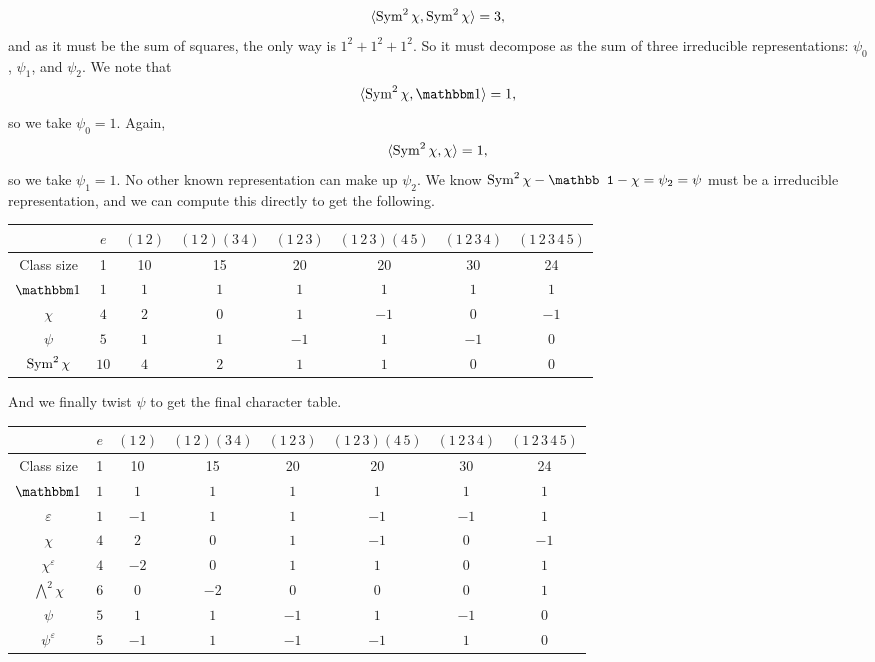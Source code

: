 \begin{example}
    \[\langle \operatorname{Sym}^2\chi, \operatorname{Sym}^2\chi \rangle = 3,\] and as it must be the sum of squares, the only way is $1^2 + 1^2 + 1^2$. So it must decompose as the sum of three irreducible representations: $\psi_0$, $\psi_1$, and $\psi_2$. We note that
    \[ \langle \Sym^2 \chi, \mathbbm 1 \rangle = 1, \]
    so we take $\psi_0 = 1$. Again,
    \[ \langle \operatorname{Sym}^2 \chi, \chi \rangle = 1, \]
    so we take $\psi_1 = 1$. No other known representation can make up $\psi_2$. We know $\Sym^2 \chi - \mathbb 1 - \chi = \psi_2 = \psi$ must be a irreducible representation, and we can compute this directly to get the following.
    \begin{center}
        \small
        \begin{tabular}{cccccccc}
            \toprule
            & $e$ & $(1\,2)$ & $(1\,2)(3\,4)$ & $(1\,2\,3)$ & $(1\,2\,3)(4\,5)$ & $(1\,2\,3\,4)$ & $(1\,2\,3\,4\,5)$ \\
            \midrule
            Class size & 1 & 10 & 15 & 20 & 20 & 30 & 24 \\
            \midrule
            $\mathbbm 1$ & $1$ & $1$ & $1$ & $1$ & $1$ & $1$ & $1$  \\
            $\chi$ & $4$ & $2$ & $0$ & $1$ & $-1$ & $0$ & $-1$ \\
            $\psi$ & $5$ & $1$ & $1$ & $-1$ & $1$ & $-1$ & $0$  \\
            \midrule
            $\operatorname{Sym}^2\chi$ & $10$ & $4$ & $2$ & $1$ & $1$ & $0$ & $0$  \\
            \bottomrule
        \end{tabular}
    \end{center}
    And we finally twist $\psi$ to get the final character table.
    \begin{center}
        \small
        \begin{tabular}{cccccccc}
            \toprule
            & $e$ & $(1\,2)$ & $(1\,2)(3\,4)$ & $(1\,2\,3)$ & $(1\,2\,3)(4\,5)$ & $(1\,2\,3\,4)$ & $(1\,2\,3\,4\,5)$ \\
            \midrule
            Class size & 1 & 10 & 15 & 20 & 20 & 30 & 24 \\
            \midrule
            $\mathbbm 1$ & $1$ & $1$ & $1$ & $1$ & $1$ & $1$ & $1$  \\
            $\varepsilon$ & $1$ & $-1$ & $1$ & $1$ & $-1$ & $-1$ & $1$ \\
            $\chi$ & $4$ & $2$ & $0$ & $1$ & $-1$ & $0$ & $-1$ \\
            $\chi^\varepsilon$ & $4$ & $-2$ & $0$ & $1$ & $1$ & $0$ & $1$ \\
            ${\bigwedge}^2\chi$ & $6$ & $0$ & $-2$ & $0$ & $0$ & $0$ & $1$  \\
            $\psi$ & $5$ & $1$ & $1$ & $-1$ & $1$ & $-1$ & $0$  \\
            $\psi^\varepsilon$ & $5$ & $-1$ & $1$ & $-1$ & $-1$ & $1$ & $0$  \\
            \bottomrule
        \end{tabular}
    \end{center}
\end{example}